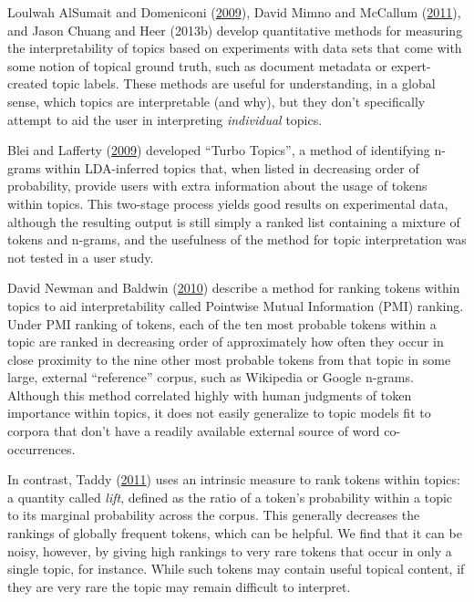 \documentclass[12pt,]{isuthesis}
\begin{document}
Loulwah AlSumait and Domeniconi
(\protect\hyperlink{ref-AlSumait}{2009}), David Mimno and McCallum
(\protect\hyperlink{ref-Mimno}{2011}), and Jason Chuang and Heer (2013b)
develop quantitative methods for measuring the interpretability of
topics based on experiments with data sets that come with some notion of
topical ground truth, such as document metadata or expert-created topic
labels. These methods are useful for understanding, in a global sense,
which topics are interpretable (and why), but they don't specifically
attempt to aid the user in interpreting \emph{individual} topics.

Blei and Lafferty (\protect\hyperlink{ref-Blei-2009}{2009}) developed
``Turbo Topics'', a method of identifying n-grams within LDA-inferred
topics that, when listed in decreasing order of probability, provide
users with extra information about the usage of tokens within topics.
This two-stage process yields good results on experimental data,
although the resulting output is still simply a ranked list containing a
mixture of tokens and n-grams, and the usefulness of the method for
topic interpretation was not tested in a user study.

David Newman and Baldwin (\protect\hyperlink{ref-Newman-JCDL}{2010})
describe a method for ranking tokens within topics to aid
interpretability called Pointwise Mutual Information (PMI) ranking.
Under PMI ranking of tokens, each of the ten most probable tokens within
a topic are ranked in decreasing order of approximately how often they
occur in close proximity to the nine other most probable tokens from
that topic in some large, external ``reference'' corpus, such as
Wikipedia or Google n-grams. Although this method correlated highly with
human judgments of token importance within topics, it does not easily
generalize to topic models fit to corpora that don't have a readily
available external source of word co-occurrences.

In contrast, Taddy (\protect\hyperlink{ref-Taddy}{2011}) uses an
intrinsic measure to rank tokens within topics: a quantity called
\emph{lift}, defined as the ratio of a token's probability within a
topic to its marginal probability across the corpus. This generally
decreases the rankings of globally frequent tokens, which can be
helpful. We find that it can be noisy, however, by giving high rankings
to very rare tokens that occur in only a single topic, for instance.
While such tokens may contain useful topical content, if they are very
rare the topic may remain difficult to interpret.
\end{document}
